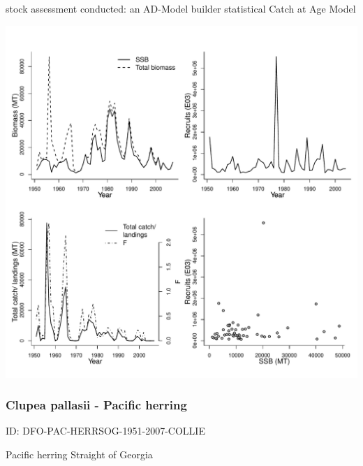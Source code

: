 stock assessment conducted: an AD-Model builder statistical Catch at Age Model 
\begin{center}
\vspace{-0.2cm}\includegraphics[scale=0.65]{../tex/figures/plot-DFO-PAC-HERRQCI-1951-2007-COLLIE.pdf}
\end{center}

\newpage
\subsubsection{Clupea pallasii - Pacific herring}
ID: DFO-PAC-HERRSOG-1951-2007-COLLIE

Pacific herring Straight of Georgia 

